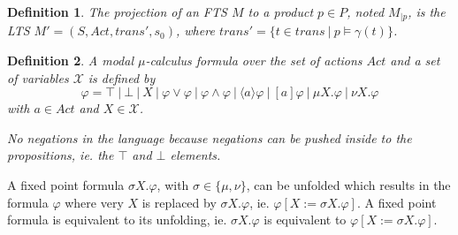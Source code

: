 \documentclass[]{article}
\newtheorem{definition}{Definition}[section]
\begin{document}
\begin{definition}
	\label{def_fts_proj}
	The projection of an FTS $M$ to a product $p \in P$, noted $M_{|p}$, is the LTS $M'=(S,Act,trans', s_0)$, where $trans' = \{t \in trans\ |\ p \models \gamma(t)\}$.
\end{definition}

\begin{definition}
	\label{def_mu_syntax}\cite{Groote}
	A modal $\mu$-calculus formula over the set of actions $Act$ and a set of variables $\mathcal{X}$ is defined by
	\[ \varphi = \top\ |\ \bot\ |\ X\ |\ \varphi \vee \varphi\ |\ \varphi \wedge \varphi\ |\ \langle a \rangle \varphi\ |\ [a]\varphi\ |\ \mu X.\varphi\ |\ \nu X.\varphi \]
	with $a \in Act$ and $X \in \mathcal{X}$. 
	
	
	No negations in the language because negations can be pushed inside to the propositions, ie. the $\top$ and $\bot$ elements.
\end{definition}
A fixed point formula $ \sigma X. \varphi$, with $\sigma \in \{\mu,\nu\}$, can be unfolded which results in the formula $\varphi$ where very $X$ is replaced by $\sigma X. \varphi$, ie. $\varphi[X:=\sigma X. \varphi]$. A fixed point formula is equivalent to its unfolding, ie. $\sigma X. \varphi$ is equivalent to $\varphi[X:=\sigma X. \varphi]$. \cite{Bradfield2018}
\end{document}
